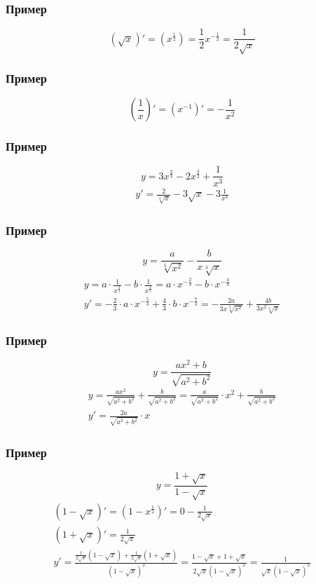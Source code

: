 \documentclass{article}
\begin{document}
\subsubsection{Пример}
\[
    (\sqrt{x})' = (x^{\frac{1}{2}}) = \frac{1}{2} x^{-\frac{1}{2}} = \frac{1}{2 \sqrt{x}}
\]

\subsubsection{Пример}
\[
    \left( \frac{1}{x} \right)' = (x^{-1})' = -\frac{1}{x^2}
\]

\subsubsection{Пример}
\[
    y = 3x^{\frac{2}{3}} - 2x^{\frac{3}{2}} + \frac{1}{x^3}
\]
\begin{gather*}
    y' = \frac{2}{\sqrt[3]{x}} - 3 \sqrt{x} - 3 \frac{1}{x^4}
\end{gather*}

\subsubsection{Пример}
\[
    y = \frac{a}{\sqrt[3]{x^2}} - \frac{b}{x \sqrt[3]{x}}
\]
\begin{gather*}
    y = a \cdot \frac{1}{x^{\frac{2}{3}}} - b \cdot \frac{1}{x^{\frac{4}{3}}} =
    a \cdot x^{-\frac{2}{3}} - b \cdot x^{-\frac{4}{3}} \\
    y' = -\frac{2}{3} \cdot a \cdot x^{-\frac{5}{3}} + \frac{4}{3} \cdot b \cdot x^{-\frac{7}{3}} =
    -\frac{2a}{3x \sqrt[3]{x^2}} + \frac{4b}{3x^2 \sqrt[3]{x}}
\end{gather*}

\subsubsection{Пример}
\[
    y = \frac{ax^2 + b}{\sqrt{a^2 + b^2}}
\]
\begin{gather*}
    y = \frac{ax^2}{\sqrt{a^2 + b^2}} + \frac{b}{\sqrt{a^2 + b^2}} = 
    \frac{a}{\sqrt{a^2 + b^2}} \cdot x^2 + \frac{b}{\sqrt{a^2 + b^2}} \\
    y' = \frac{2a}{\sqrt{a^2 + b^2}} \cdot x
\end{gather*}

\subsubsection{Пример}
\[
    y = \frac{1 + \sqrt{x}}{1 - \sqrt{x}}
\]
\begin{gather*}
    (1 - \sqrt{x})' = (1 - x^{\frac{1}{2}})' = 0 - \frac{1}{2 \sqrt{x}} \\
    (1 + \sqrt{x})' = \frac{1}{2 \sqrt{x}} \\
    y' = \frac{\frac{1}{2 \sqrt{x}} (1 - \sqrt{x}) + \frac{1}{2 \sqrt{x}} (1 + \sqrt{x})}{(1 - \sqrt{x})^2} =
    \frac{1 - \sqrt{x} + 1 + \sqrt{x}}{2 \sqrt{x} (1 - \sqrt{x})^2} =
    \frac{1}{\sqrt{x} (1 - \sqrt{x})^2}
\end{gather*}
\end{document}
